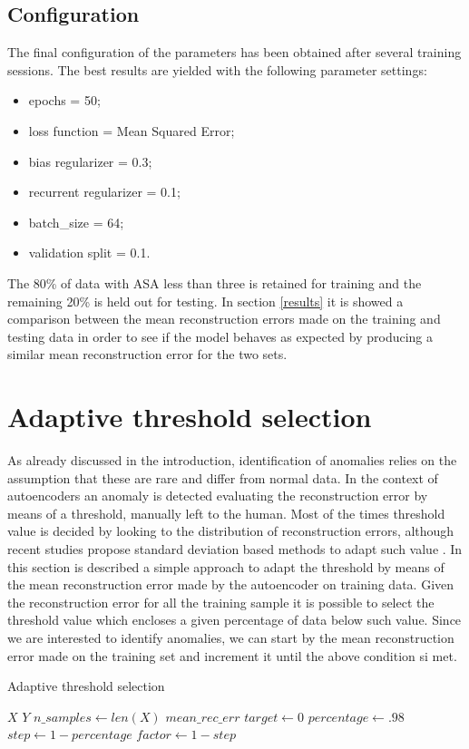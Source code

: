 \documentclass{article}
\begin{document}
\begin{multicols*}{2}
\subsection{Configuration} 
The final configuration of the parameters has been obtained after several training sessions.
The best results are yielded with the following parameter settings: 
\begin{itemize}
	\item epochs = 50;
	\item loss function =  Mean Squared Error;
	\item bias regularizer = 0.3;
	\item recurrent regularizer = 0.1;
	\item batch\_size = 64;
	\item validation split = 0.1.
\end{itemize}

The 80\% of data with ASA less than three is retained for training and the remaining 20\% is held out for testing.
In section \ref{results} it is showed a comparison between the mean reconstruction errors made on the training and testing data in order to see if the model behaves as expected by producing a similar mean reconstruction error for the two sets.

\section{Adaptive threshold selection}
As already discussed in the introduction, identification of anomalies relies on the assumption that these are rare and differ from normal data. In the context of autoencoders an anomaly is detected evaluating the reconstruction error by means of a threshold, manually left to the human. Most of the times threshold value is decided by looking to the distribution of reconstruction errors, although recent studies propose standard deviation based methods to adapt such value \cite{adaptivethresh}.
In this section is described a simple approach to adapt the threshold by means of the mean reconstruction error made by the autoencoder on training data. Given the reconstruction error for all the training sample it is possible to select the threshold value which encloses a given percentage of data below such value. Since we are interested to identify anomalies, we can start by the mean reconstruction error made on the training set and increment it until the above condition si met.


\begin{algorithm}[H]
\caption*{Adaptive threshold selection}
\begin{algorithmic}
	\STATE $X$ 
	\STATE $Y$ 
	\STATE $n\_samples \gets len(X)$ 
	\STATE $mean\_rec\_err $ 
	\STATE $target \gets 0$
	\STATE $percentage \gets .98$
	\STATE $step \gets 1 - percentage$
	\STATE $factor \gets 1 - step$
	

\end{algorithmic}
\end{algorithm}
\end{multicols*}
\end{document}
